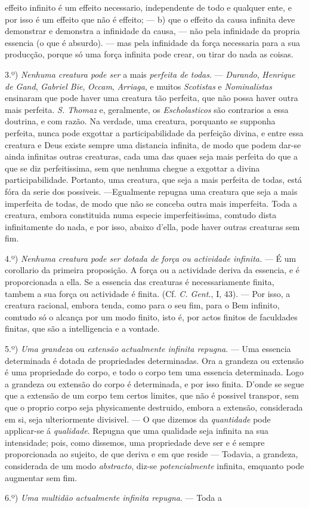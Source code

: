 effeito infinito é um effeito necessario, independente de todo e qualquer ente, e por isso é um effeito que não é effeito; --- b) que o effeito da causa infinita deve demonstrar e demonstra a infinidade da causa, --- não pela infinidade da propria essencia (o que é absurdo). --- mas pela infinidade da força necessaria para a sua producção, porque só uma força infinita pode crear, ou tirar do nada as coisas.\par 3.º) \emph{Nenhuma creatura pode ser} a mais \emph{perfeita de todas}. --- \emph{Durando}, \emph{Henrique de Gand}, \emph{Gabriel Bie}, \emph{Occam}, \emph{Arriaga}, e muitos \emph{Scotistas} e \emph{Nominalistas} ensinaram que pode haver uma creatura tão perfeita, que não possa haver outra mais perfeita. \emph{S. Thomaz} e, geralmente, os \emph{Escholasticos} são contrarios a essa doutrina, e com razão. Na verdade, uma creatura, porquanto se supponha perfeita, nunca pode exgottar a participabilidade da perfeição divina, e entre essa creatura e Deus existe sempre uma distancia infinita, de modo que podem dar-se ainda infinitas outras creaturas, cada uma das quaes seja mais perfeita do que a que se diz perfeitissima, sem que nenhuma chegue a exgottar a divina participabilidade. Portanto, uma creatura, que seja a mais perfeita de todas, está fóra da serie dos possiveis. ---Egualmente repugna uma creatura que seja a mais imperfeita de todas, de modo que não se conceba outra mais imperfeita. Toda a creatura, embora constituida numa especie imperfeitissima, comtudo dista infinitamente do nada, e por isso, abaixo d'ella, pode haver outras creaturas sem fim.\par 4.º) \emph{Nenhuma creatura pode ser dotada de força ou actividade infinita.} --- É um corollario da primeira proposição. A força ou a actividade deriva da essencia, e é proporcionada a ella. Se a essencia das creaturas é necessariamente finita, tambem a sua força ou actividade é finita. (Cf. \emph{C. Gent.}, I, 43). --- Por isso, a creatura racional, embora tenda, como para o seu fim, para o Bem infinito, comtudo só o alcança por um modo finito, isto é, por actos finitos de faculdades finitas, que são a intelligencia e a vontade.\par 5.º) \emph{Uma grandeza} ou \emph{extensão actualmente infinita repugna}. --- Uma essencia determinada é dotada de propriedades determinadas. Ora a grandeza ou extensão é uma propriedade do corpo, e todo o corpo tem uma essencia determinada. Logo a grandeza ou extensão do corpo é determinada, e por isso finita. D'onde se segue que a extensão de um corpo tem certos limites, que não é possivel transpor, sem que o proprio corpo seja physicamente destruido, embora a extensão, considerada em si, seja ulteriormente divisivel. --- O que dizemos da \emph{quantidade} pode applicar-se á \emph{qualidade}. Repugna que uma qualidade seja infinita na sua intensidade; pois, como dissemos, uma propriedade deve ser e é sempre proporcionada ao sujeito, de que deriva e em que reside --- Todavia, a grandeza, considerada de um modo \emph{abstracto}, diz-se \emph{potencialmente} infinita, emquanto pode augmentar sem fim.\par 6.º) \emph{Uma multidão actualmente infinita repugna}. --- Toda a 